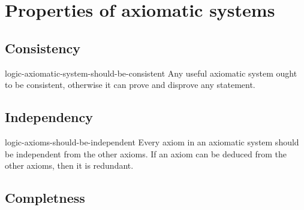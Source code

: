 \documentclass[preview]{standalone}
\begin{document}
\genpage

\section{Properties of axiomatic systems}

\subsection{Consistency}


\begin{snippet}{logic-axiomatic-system-should-be-consistent}
Any useful axiomatic system ought to be consistent, otherwise it can prove and disprove any statement.
\end{snippet}

\subsection{Independency}


\begin{snippet}{logic-axioms-should-be-independent}
Every axiom in an axiomatic system should be independent from the other axioms.
If an axiom can be deduced from the other axioms, then it is redundant.
\end{snippet}

\subsection{Completness}

\end{document}

